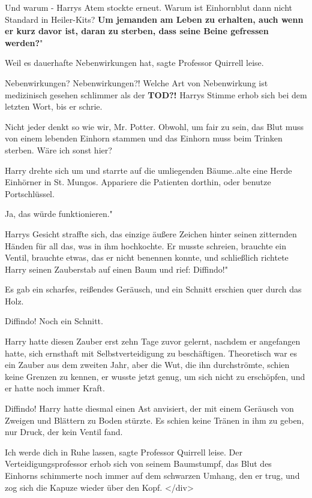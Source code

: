 \glqq Und warum -\grqq{} Harrys Atem stockte erneut. \glqq Warum ist Einhornblut
dann nicht Standard in Heiler-Kits? \textbf{Um jemanden am Leben zu
erhalten, auch wenn er kurz davor ist, daran zu sterben, dass seine Beine
gefressen werden?}"

\glqq Weil es dauerhafte Nebenwirkungen hat\grqq{}, sagte Professor Quirrell
leise.

\glqq Nebenwirkungen? Nebenwirkungen?! Welche Art von Nebenwirkung ist
medizinisch gesehen schlimmer als der \textbf{TOD?!}\grqq{} Harrys Stimme
erhob sich bei dem letzten Wort, bis er schrie.

\glqq Nicht jeder denkt so wie wir, Mr. Potter. Obwohl, um fair zu sein, das
Blut muss von einem lebenden Einhorn stammen und das Einhorn muss beim
Trinken sterben. Wäre ich sonst hier?\grqq{}

Harry drehte sich um und starrte auf die umliegenden Bäume.\grqq{}.alte eine
Herde Einhörner in St. Mungos. Appariere die Patienten dorthin, oder
benutze Portschlüssel.\grqq{}

\glqq Ja, das würde funktionieren."

Harrys Gesicht straffte sich, das einzige äußere Zeichen hinter seinen
zitternden Händen für all das, was in ihm hochkochte. Er musste schreien,
brauchte ein Ventil, brauchte etwas, das er nicht benennen konnte, und
schließlich richtete Harry seinen Zauberstab auf einen Baum und rief:
\glqq Diffindo!"

Es gab ein scharfes, reißendes Geräusch, und ein Schnitt erschien quer durch das
Holz.

\glqq Diffindo!\grqq{} Noch ein Schnitt.

Harry hatte diesen Zauber erst zehn Tage zuvor gelernt, nachdem er angefangen
hatte, sich ernsthaft mit Selbstverteidigung zu beschäftigen. Theoretisch
war es ein Zauber aus dem zweiten Jahr, aber die Wut, die ihn
durchströmte, schien keine Grenzen zu kennen, er wusste jetzt genug, um
sich nicht zu erschöpfen, und er hatte noch immer Kraft.

\glqq Diffindo!\grqq{} Harry hatte diesmal einen Ast anvisiert, der mit einem
Geräusch von Zweigen und Blättern zu Boden stürzte. Es schien keine
Tränen in ihm zu geben, nur Druck, der kein Ventil fand.

\glqq Ich werde dich in Ruhe lassen\grqq{}, sagte Professor Quirrell leise. Der
Verteidigungsprofessor erhob sich von seinem Baumstumpf, das Blut des
Einhorns schimmerte noch immer auf dem schwarzen Umhang, den er trug, und
zog sich die Kapuze wieder über den Kopf. </div>